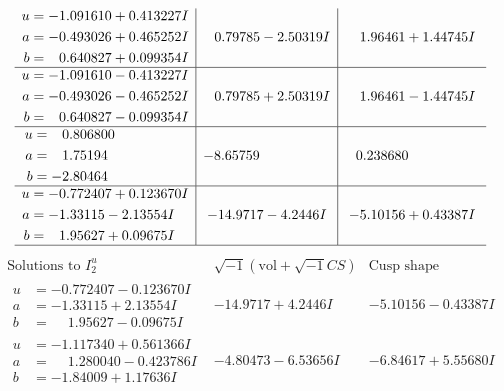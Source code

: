 \documentclass[1p]{elsarticle_modified}
\theoremstyle{definition}
\newcommand{\I}{\sqrt{-1}}
\begin{document}
$$\begin{array}{c|c|c}
\begin{aligned}
u &= -1.091610 + 0.413227 I \\
a &= -0.493026 + 0.465252 I \\
b &= \phantom{-}0.640827 + 0.099354 I\end{aligned}
 & \phantom{-}0.79785 - 2.50319 I & \phantom{-}1.96461 + 1.44745 I \\ \hline\begin{aligned}
u &= -1.091610 - 0.413227 I \\
a &= -0.493026 - 0.465252 I \\
b &= \phantom{-}0.640827 - 0.099354 I\end{aligned}
 & \phantom{-}0.79785 + 2.50319 I & \phantom{-}1.96461 - 1.44745 I \\ \hline\begin{aligned}
u &= \phantom{-}0.806800\phantom{ +0.000000I} \\
a &= \phantom{-}1.75194\phantom{ +0.000000I} \\
b &= -2.80464\phantom{ +0.000000I}\end{aligned}
 & -8.65759\phantom{ +0.000000I} & \phantom{-}0.238680\phantom{ +0.000000I} \\ \hline\begin{aligned}
u &= -0.772407 + 0.123670 I \\
a &= -1.33115 - 2.13554 I \\
b &= \phantom{-}1.95627 + 0.09675 I\end{aligned}
 & -14.9717 - 4.2446 I & -5.10156 + 0.43387 I\\
 \hline 
 \end{array}$$\newpage$$\begin{array}{c|c|c}  
\text{Solutions to }I^u_{2}& \I (\text{vol} + \sqrt{-1}CS) & \text{Cusp shape}\\
 \hline 
\begin{aligned}
u &= -0.772407 - 0.123670 I \\
a &= -1.33115 + 2.13554 I \\
b &= \phantom{-}1.95627 - 0.09675 I\end{aligned}
 & -14.9717 + 4.2446 I & -5.10156 - 0.43387 I \\ \hline\begin{aligned}
u &= -1.117340 + 0.561366 I \\
a &= \phantom{-}1.280040 - 0.423786 I \\
b &= -1.84009 + 1.17636 I\end{aligned}
 & -4.80473 - 6.53656 I & -6.84617 + 5.55680 I \\ \hline\begin{aligned}

\end{aligned}
\end{array}$$
\end{document}
